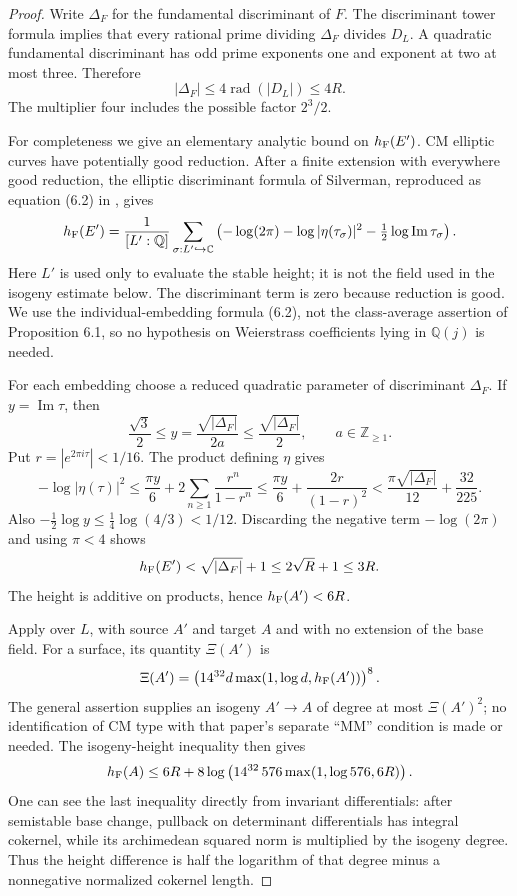\documentclass[11pt]{article}
\theoremstyle{definition}
\theoremstyle{remark}
\begin{document}
\begin{proof}
Write $\Delta_F$ for the fundamental discriminant of $F$. The
discriminant tower formula implies that every rational prime dividing
$\Delta_F$ divides $D_L$. A quadratic fundamental discriminant has
odd prime exponents one and exponent at two at most three. Therefore
\[
 |\Delta_F|\le4\operatorname{rad}(|D_L|)\le4R.
\]
The multiplier four includes the possible factor $2^3/2$.

For completeness we give an elementary analytic bound on $h_{\rm F}(E')$.
CM elliptic curves have potentially good reduction. After a finite
extension with everywhere good reduction, the elliptic discriminant
formula of Silverman, reproduced as equation (6.2) in
\cite{cmheight}, gives
\[
 h_{\rm F}(E')=\frac1{[L':\mathbb Q]}\sum_{\sigma:L'\hookrightarrow\mathbb C}
 \left(-\log(2\pi)-\log|\eta(\tau_\sigma)|^2
                     -\tfrac12\log\operatorname{Im}\tau_\sigma\right).
\]
Here $L'$ is used only to evaluate the stable height; it is not the
field used in the isogeny estimate below. The discriminant term is zero
because reduction is good. We use the individual-embedding formula
(6.2), not the class-average assertion of Proposition 6.1, so no
hypothesis on Weierstrass coefficients lying in $\mathbb Q(j)$ is needed.

For each embedding choose a reduced quadratic parameter of discriminant
$\Delta_F$. If $y=\operatorname{Im}\tau$, then
\[
 \frac{\sqrt3}{2}\le y=\frac{\sqrt{|\Delta_F|}}{2a}
                   \le\frac{\sqrt{|\Delta_F|}}2,
 \qquad a\in\mathbb Z_{\ge1}.
\]
Put $r=|e^{2\pi i\tau}|<1/16$. The product defining $\eta$ gives
\[
 -\log|\eta(\tau)|^2
 \le\frac{\pi y}{6}+2\sum_{n\ge1}\frac{r^n}{1-r^n}
 \le\frac{\pi y}{6}+\frac{2r}{(1-r)^2}
 <\frac{\pi\sqrt{|\Delta_F|}}{12}+\frac{32}{225}.
\]
Also $-\tfrac12\log y\le\tfrac14\log(4/3)<1/12$.
Discarding the negative term $-\log(2\pi)$ and using $\pi<4$ shows
\[
 h_{\rm F}(E')<\sqrt{|\Delta_F|}+1\le2\sqrt R+1\le3R.
\]
The height is additive on products, hence $h_{\rm F}(A')<6R$.

Apply \cite[Theorem 1.9(1)]{GaudronRemond2023} over $L$, with source
$A'$ and target $A$ and with no extension of the base field.
For a surface, its quantity $\Xi(A')$ is
\[
 \Xi(A')=\left(14^{32}d\max(1,\log d,h_{\rm F}(A'))\right)^8.
\]
The general assertion supplies an isogeny $A'\to A$ of degree at most
$\Xi(A')^2$; no identification of CM type with that paper's
separate ``MM'' condition is made or needed. The isogeny-height
inequality then gives
\[
 h_{\rm F}(A)\le6R+
 8\log\left(14^{32}\,576\max(1,\log576,6R)\right).
\]
One can see the last inequality directly from invariant differentials:
after semistable base change, pullback on determinant differentials has
integral cokernel, while its archimedean squared norm is multiplied by
the isogeny degree. Thus the height difference is half the logarithm
of that degree minus a nonnegative normalized cokernel length.


\end{proof}
\end{document}
